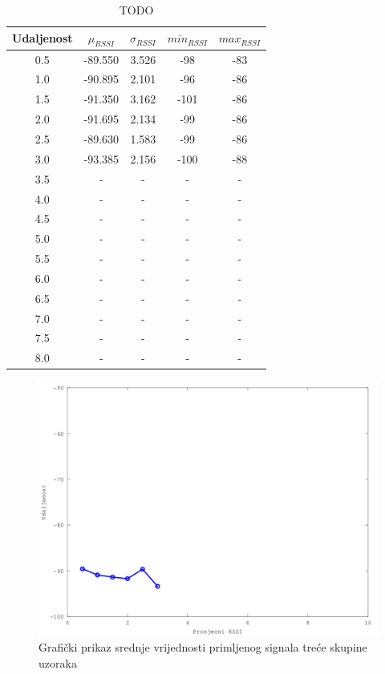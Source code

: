 
\begin{table}[H]
	\centering
	\caption{TODO}
	\label{tbl:blucatsDefault}
	\begin{tabular}{ccccc}
	\hline
	Udaljenost & $\mu_{RSSI}$ & $\sigma_{RSSI}$ & $min_{RSSI}$ & $max_{RSSI}$ \\
	\hline
	0.5 & -89.550 & 3.526 & -98 & -83 \\
	1.0 & -90.895 & 2.101 & -96 & -86 \\
	1.5 & -91.350 & 3.162 & -101 & -86 \\
	2.0 & -91.695 & 2.134 & -99 & -86 \\
	2.5 & -89.630 & 1.583 & -99 & -86 \\
	3.0 & -93.385 & 2.156 & -100 & -88 \\
	3.5 & - & - & - & - \\
	4.0 & - & - & - & - \\
	4.5 & - & - & - & - \\
	5.0 & - & - & - & - \\
	5.5 & - & - & - & - \\
	6.0 & - & - & - & - \\
	6.5 & - & - & - & - \\
	7.0 & - & - & - & - \\
	7.5 & - & - & - & - \\
	8.0 & - & - & - & - \\
	\hline
	\end{tabular}
\end{table}

\begin{figure}[H]
    \centering
    \includegraphics[scale=0.62]{pictures/treca-skupina-uzoraka}
    \caption{Grafički prikaz srednje vrijednosti primljenog signala treće skupine uzoraka}
    \label{fig:prva_skupina}
\end{figure}

